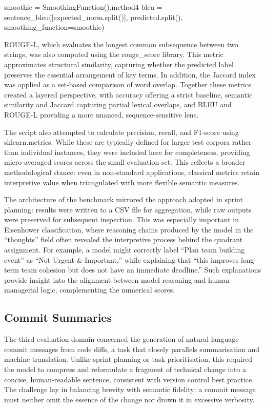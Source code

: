 \documentclass{report}
\begin{document}
\begin{python}
smoothie = SmoothingFunction().method4
bleu = sentence_bleu([expected_norm.split()], predicted.split(), smoothing_function=smoothie)

\end{python}

ROUGE-L, which evaluates the longest common subsequence between two strings, was also computed using the rouge_score library. 
This metric approximates structural similarity, capturing whether the predicted label preserves the essential arrangement of key terms. 
In addition, the Jaccard index was applied as a set-based comparison of word overlap. 
Together these metrics created a layered perspective, with accuracy offering a strict baseline, semantic similarity and Jaccard capturing partial lexical overlaps, and BLEU and ROUGE-L providing a more nuanced, sequence-sensitive lens.

The script also attempted to calculate precision, recall, and F1-score using sklearn.metrics. 
While these are typically defined for larger test corpora rather than individual instances, they were included here for completeness, providing micro-averaged scores across the small evaluation set. 
This reflects a broader methodological stance: even in non-standard applications, classical metrics retain interpretive value when triangulated with more flexible semantic measures.

The architecture of the benchmark mirrored the approach adopted in sprint planning: results were written to a CSV file for aggregation, while raw outputs were preserved for subsequent inspection. 
This was especially important in Eisenhower classification, where reasoning chains produced by the model in the “thoughts” field often revealed the interpretive process behind the quadrant assignment. 
For example, a model might correctly label “Plan team building event” as “Not Urgent & Important,” while explaining that “this improves long-term team cohesion but does not have an immediate deadline.” 
Such explanations provide insight into the alignment between model reasoning and human managerial logic, complementing the numerical scores.

\subsection{Commit Summaries}

The third evaluation domain concerned the generation of natural language commit messages from code diffs, a task that closely parallels summarisation and machine translation. 
Unlike sprint planning or task prioritisation, this required the model to compress and reformulate a fragment of technical change into a concise, human-readable sentence, consistent with version control best practice. 
The challenge lay in balancing brevity with semantic fidelity: a commit message must neither omit the essence of the change nor drown it in excessive verbosity.
\end{document}
